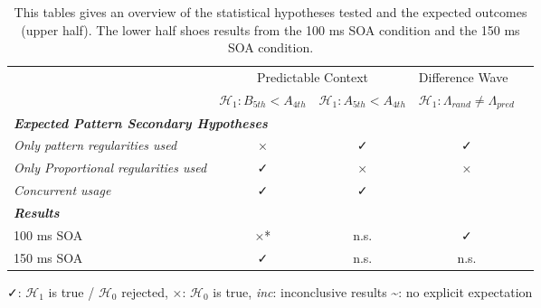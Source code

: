 

\begin{table}
\caption{This tables gives an overview of the statistical hypotheses tested and the expected outcomes (upper half). The lower half shoes results from the 100 ms SOA condition and the 150 ms SOA condition.}
\centering
\begin{tabular*}{\textwidth}{lcllc} 
\toprule
                                                                                                                & \multicolumn{2}{c}{Predictable Context}               & Difference Wave                                                \\ 
\cmidrule(lr){2-3}\cmidrule(lr){4-4}
\multicolumn{1}{c}{}                                                                         & $\mathcal{H_1}: B_{5th}<A_{4th}$     & $\mathcal{H_1}: A_{5th}<A_{4th}$     & \multicolumn{1}{c}{$\mathcal{H_1}: \Lambda_{rand} \neq \Lambda_{pred}$ }  \\ 
\midrule
\multicolumn{5}{l}{\textbf{\textit{Expected Pattern Secondary Hypotheses}}}  \\
\hspace{3mm}\textit{Only pattern regularities used}                                                                                         & \multicolumn{1}{c}{×} & \multicolumn{1}{c}{✓} & \multicolumn{1}{c}{✓}\\
\hspace{3mm}\textit{Only Proportional regularities used}                                                                                    & \multicolumn{1}{c}{✓} & \multicolumn{1}{c}{×} & \multicolumn{1}{c}{×}\\
\hspace{3mm}\textit{Concurrent usage}                                								         & \multicolumn{1}{c}{✓} & \multicolumn{1}{c}{✓} & \multicolumn{1}{c}{}\\
\multicolumn{5}{l}{\textbf{\textit{Results}}}  \\
\hspace{3mm}100 ms SOA                                                                                                                      & \multicolumn{1}{c}{×*}                 & \multicolumn{1}{c}{n.s.}                    & \multicolumn{1}{c}{✓}                                      \\
\hspace{3mm}150 ms SOA                                                                                                                      & \multicolumn{1}{c}{✓}                      & \multicolumn{1}{c}{n.s.}                    & \multicolumn{1}{c}{n.s.}                                    \\
\bottomrule
\end{tabular*}
 \begin{tablenotes}
      \small
      \item ✓: $\mathcal{H_1}$ is true / $\mathcal{H_0}$ rejected, ×: $\mathcal{H_0}$ is true, \textit{inc}: inconclusive results \~{}: no explicit expectation
    \end{tablenotes}
\end{table}
